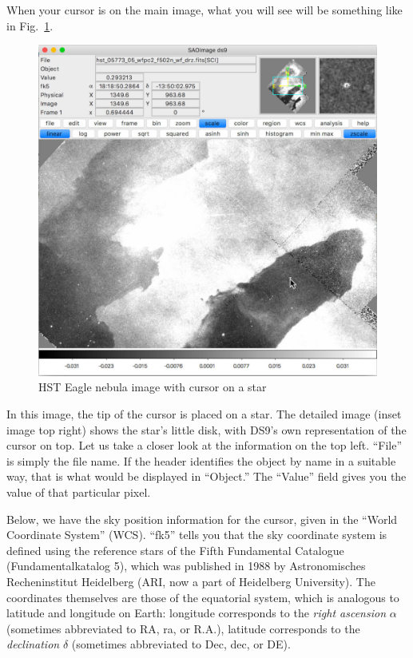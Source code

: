\documentclass[twocolumn,apj]{openjournal}
\begin{document}
When your cursor is on the main image, what you will see will be something like in Fig.~\ref{Eagle3}.
\begin{figure}[htbp]
\begin{center}
\includegraphics[width=\linewidth]{ds9-eagle3.jpg}
\caption{HST Eagle nebula image with cursor on a star}
\label{Eagle3}
\end{center}
\end{figure}
In this image, the tip of the cursor is placed on a star. The detailed image (inset image top right) shows the star's little disk, with DS9's own representation of the cursor on top. Let us take a closer look at the information on the top left. ``File'' is simply the file name. If the header identifies the object by name in a suitable way, that is what would be displayed in ``Object.'' The ``Value'' field gives you the value of that particular pixel. 

Below, we have the sky position information for the cursor, given in the ``World Coordinate System'' (WCS). ``fk5'' tells you that the sky coordinate system is defined using the reference stars of the Fifth Fundamental Catalogue (Fundamentalkatalog 5), which was published in 1988 by Astronomisches Recheninstitut Heidelberg (ARI, now a part of Heidelberg University). The coordinates themselves are those of the equatorial system, which is analogous to latitude and longitude on Earth: longitude corresponds to the {\em right ascension} $\alpha$ (sometimes abbreviated to RA, ra, or R.A.), latitude corresponds to the {\em declination} $\delta$ (sometimes abbreviated to Dec, dec, or DE). 
\end{document}
